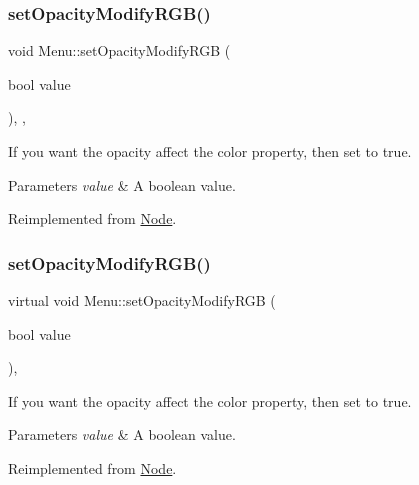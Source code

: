 \subsubsection{\texorpdfstring{set\+Opacity\+Modify\+R\+G\+B()}{setOpacityModifyRGB()}\hspace{0.1cm}{\footnotesize\ttfamily [1/2]}}
{\footnotesize\ttfamily void Menu\+::set\+Opacity\+Modify\+R\+GB (\begin{DoxyParamCaption}\item[{bool}]{value }\end{DoxyParamCaption})\hspace{0.3cm}{\ttfamily [inline]}, {\ttfamily [override]}, {\ttfamily [virtual]}}

If you want the opacity affect the color property, then set to true. 
\begin{DoxyParams}{Parameters}
{\em value} & A boolean value. \\
\hline
\end{DoxyParams}


Reimplemented from \hyperlink{classNode_a978c5435ab23f76e9efdf0f7e9e288e5}{Node}.

\mbox{\label{classMenu_ae2979f44049f67f2a2411cb3901842ef}} 
\subsubsection{\texorpdfstring{set\+Opacity\+Modify\+R\+G\+B()}{setOpacityModifyRGB()}\hspace{0.1cm}{\footnotesize\ttfamily [2/2]}}
{\footnotesize\ttfamily virtual void Menu\+::set\+Opacity\+Modify\+R\+GB (\begin{DoxyParamCaption}\item[{bool}]{value }\end{DoxyParamCaption})\hspace{0.3cm}{\ttfamily [override]}, {\ttfamily [virtual]}}

If you want the opacity affect the color property, then set to true. 
\begin{DoxyParams}{Parameters}
{\em value} & A boolean value. \\
\hline
\end{DoxyParams}


Reimplemented from \hyperlink{classNode_a978c5435ab23f76e9efdf0f7e9e288e5}{Node}.



